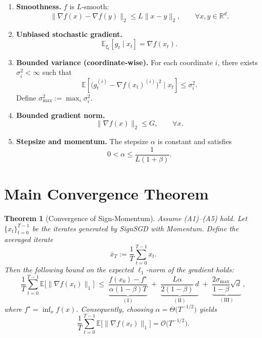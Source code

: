 \documentclass[11pt]{article}
\newtheorem{theorem}{Theorem}[section]
\begin{document}
\begin{enumerate}
    \item \textbf{Smoothness.} $f$ is $L$‑smooth:
    \[
        \|\nabla f(x)-\nabla f(y)\|_{2}\le L\|x-y\|_{2},\qquad \forall x,y\in\mathbb{R}^{d}. \tag{A1}
    \]
    \item \textbf{Unbiased stochastic gradient.}
    \[
        \mathbb{E}_{\xi_{t}}[g_{t}\mid x_{t}]=\nabla f(x_{t}). \tag{A2}
    \]
    \item \textbf{Bounded variance (coordinate‑wise).}
    For each coordinate $i$, there exists $\sigma_{i}^{2}<\infty$ such that
    \[
        \mathbb{E}\!\left[\big(g_{t}^{(i)}-\nabla f(x_{t})^{(i)}\big)^{2}\mid x_{t}\right]\le \sigma_{i}^{2}. \tag{A3}
    \]
    Define $\sigma_{\max}^{2}:=\max_{i}\sigma_{i}^{2}$.
    \item \textbf{Bounded gradient norm.}
    \[
        \|\nabla f(x)\|_{2}\le G,\qquad \forall x. \tag{A4}
    \]
    \item \textbf{Stepsize and momentum.}
    The stepsize $\alpha$ is constant and satisfies
    \[
        0<\alpha\le \frac{1}{L(1+\beta)}. \tag{A5}
    \]
\end{enumerate}

\section*{Main Convergence Theorem}
\begin{theorem}[Convergence of Sign‑Momentum]\label{thm:main}
Assume (A1)–(A5) hold. Let $\{x_{t}\}_{t=0}^{T-1}$ be the iterates generated by SignSGD with Momentum. Define the averaged iterate
\[
    \bar{x}_{T}:=\frac{1}{T}\sum_{t=0}^{T-1}x_{t}.
\]
Then the following bound on the expected $\ell_{1}$‑norm of the gradient holds:
\[
    \frac{1}{T}\sum_{t=0}^{T-1}\mathbb{E}\big[\|\nabla f(x_{t})\|_{1}\big]
    \;\le\;
    \underbrace{\frac{f(x_{0})-f^{\star}}{\alpha(1-\beta)T}}_{(\mathrm{I})}
    \;+\;
    \underbrace{ \frac{L\alpha}{2(1-\beta)}\,d}_{(\mathrm{II})}
    \;+\;
    \underbrace{\frac{2\sigma_{\max}}{1-\beta}\sqrt{d}}_{(\mathrm{III})}\,,
\tag{1}
\]
where $f^{\star}=\inf_{x}f(x)$. Consequently, choosing $\alpha = \Theta\!\big(T^{-1/2}\big)$ yields
\[
    \frac{1}{T}\sum_{t=0}^{T-1}\mathbb{E}\big[\|\nabla f(x_{t})\|_{1}\big]
    =\mathcal{O}\!\big(T^{-1/2}\big).
\]
\end{theorem}
\end{document}
